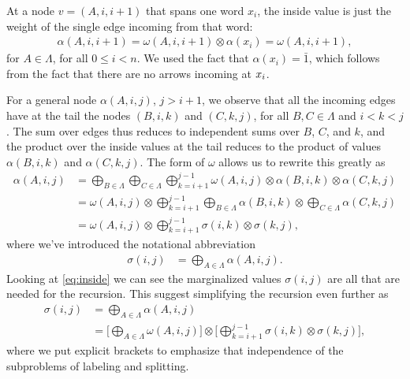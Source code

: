   At a node $v = (A, i, i+1)$ that spans one word $x_i$, the inside value is just the weight of the single edge incoming from that word:
  \begin{align}
      \label{eq:inside-base}
      \alpha(A, i, i+1) = \omega(A, i, i+1) \otimes \alpha(x_i) = \omega(A, i, i+1),
  \end{align}
  for $A \in \Lambda$, for all $0 \leq i < n$. We used the fact that $\alpha(x_i) = \bar{1}$, which follows from the fact that there are no arrows incoming at $x_i$.

  For a general node $\alpha(A, i, j)$, $j > i + 1$, we observe that all the incoming edges have at the tail the nodes $(B, i, k)$ and $(C, k, j)$, for all $B, C \in \Lambda$ and $i < k < j$. The sum over edges thus reduces to independent sums over $B$, $C$, and $k$, and the product over the inside values at the tail reduces to the product of values $\alpha(B, i, k)$ and $\alpha(C, k, j)$. The form of $\omega$ allows us to rewrite this greatly as
  \begin{align}
    \label{eq:inside}
    \alpha(A, i, j)
      &= \bigoplus_{B \in \Lambda} \bigoplus_{C \in \Lambda} \bigoplus_{k=i+1}^{j-1} \omega(A, i, j) \otimes \alpha(B,i,k) \otimes \alpha(C,k,j) \nonumber \\
      &= \omega(A, i, j) \otimes \bigoplus_{k=i+1}^{j-1} \bigoplus_{B \in \Lambda} \alpha(B,i,k) \otimes \bigoplus_{C \in \Lambda} \alpha(C,k,j) \nonumber \\
      &= \omega(A, i, j) \otimes \bigoplus_{k=i+1}^{j-1} \sigma(i,k) \otimes \sigma(k,j),
  \end{align}
  where we've introduced the notational abbreviation
  \begin{align*}
      \sigma(i,j) &= \bigoplus_{A \in \Lambda} \alpha(A,i,j).
  \end{align*}
  Looking at \ref{eq:inside} we can see the marginalized values $\sigma(i, j)$ are all that are needed for the recursion. This suggest simplifying the recursion even further as
  \begin{align}
    \label{eq:inside-simplified}
    \sigma(i, j)
      &= \bigoplus_{A \in \Lambda} \alpha(A,i,j) \nonumber \\
      &= \Bigg[ \bigoplus_{A \in \Lambda} \omega(A, i, j) \Bigg] \otimes \Bigg[\bigoplus_{k=i+1}^{j-1} \sigma(i,k) \otimes  \sigma(k,j) \Bigg],
  \end{align}
  where we put explicit brackets to emphasize that independence of the subproblems of labeling and splitting.

